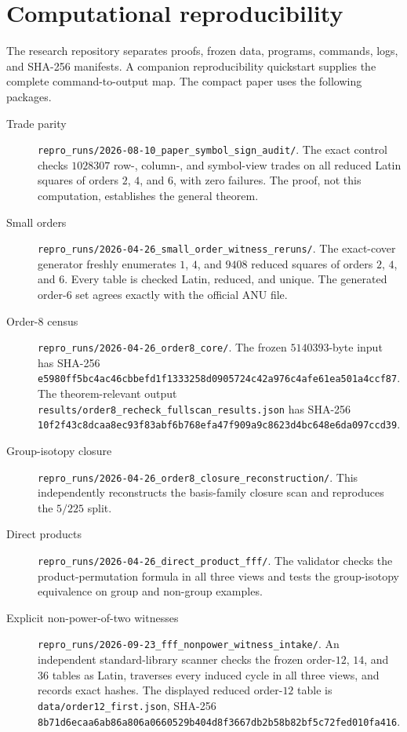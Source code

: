 \section{Computational reproducibility}\label{sec:reproducibility}

The research repository separates proofs, frozen data, programs, commands, logs, and
SHA-256 manifests.  A companion reproducibility quickstart supplies the
complete command-to-output map.  The compact paper uses the following
packages.



\begin{description}
\item[Trade parity]
\nolinkurl{repro_runs/2026-08-10_paper_symbol_sign_audit/}.
The exact control checks $1028307$ row-, column-, and symbol-view trades on all
reduced Latin squares of orders $2$, $4$, and $6$, with zero failures.  The
proof, not this computation, establishes the general theorem.

\item[Small orders]
\nolinkurl{repro_runs/2026-04-26_small_order_witness_reruns/}.
The exact-cover generator freshly enumerates $1$, $4$, and $9408$ reduced
squares of orders $2$, $4$, and $6$.  Every table is checked Latin, reduced,
and unique.  The generated order-$6$ set agrees exactly with the official ANU
file.

\item[Order-$8$ census]
\nolinkurl{repro_runs/2026-04-26_order8_core/}.
The frozen $5140393$-byte input has SHA-256
\nolinkurl{e5980ff5bc4ac46cbbefd1f1333258d0905724c42a976c4afe61ea501a4ccf87}.
The theorem-relevant output
\nolinkurl{results/order8_recheck_fullscan_results.json} has SHA-256
\nolinkurl{10f2f43c8dcaa8ec93f83abf6b768efa47f909a9c8623d4bc648e6da097ccd39}.

\item[Group-isotopy closure]
\nolinkurl{repro_runs/2026-04-26_order8_closure_reconstruction/}.
This independently reconstructs the basis-family closure scan and reproduces
the $5/225$ split.

\item[Direct products]
\nolinkurl{repro_runs/2026-04-26_direct_product_fff/}.
The validator checks the product-permutation formula in all three views and
tests the group-isotopy equivalence on group and non-group examples.

\item[Explicit non-power-of-two witnesses]
\nolinkurl{repro_runs/2026-09-23_fff_nonpower_witness_intake/}.
An independent standard-library scanner checks the frozen order-$12$,
$14$, and $36$ tables as Latin, traverses every induced cycle in all three
views, and records exact hashes. The displayed reduced order-$12$ table is
\nolinkurl{data/order12_first.json}, SHA-256
\nolinkurl{8b71d6ecaa6ab86a806a0660529b404d8f3667db2b58b82bf5c72fed010fa416}.


\end{description}
